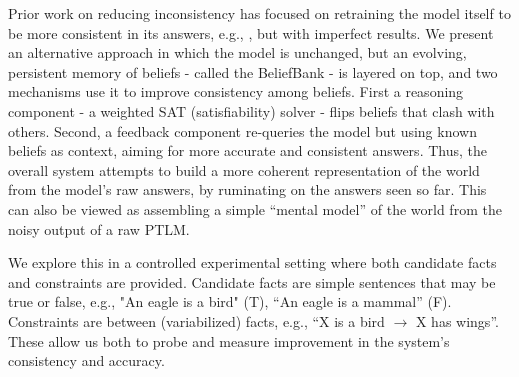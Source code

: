 \documentclass[11pt]{article}
\newcommand{\eat}[1]{}
\newcommand{\red}[1]{\textcolor{red}{#1}}
\begin{document}
Prior work on reducing inconsistency has focused on retraining the model itself to be
more consistent in its answers, e.g., \cite{Ribeiro2019AreRR,Li2019ALF}, but with imperfect results. We present an
alternative approach in which the model is unchanged, but an evolving, persistent memory
of beliefs - called the BeliefBank - is layered on top, and two mechanisms use it 
to improve consistency among beliefs. First a reasoning component - a weighted SAT (satisfiability) solver -
flips beliefs that clash with others. Second, a feedback component re-queries the model
but using known beliefs as context, aiming for more accurate and consistent answers. 
Thus, the overall system attempts to build a more coherent representation of the
world from the model's raw answers, by ruminating on the answers seen so far.
This can also be viewed as assembling a simple ``mental model'' of the world \cite{JohnsonLaird1983MentalM} from
the noisy output of a raw PTLM.

\eat{
In addition, 
just as the model helps populate the BeliefBank, we also show how beliefs in
the BeliefBank can improve the model's answers to future questions,
by using the most relevant beliefs as additional context for question-answering
(i.e., reminding the model of important facts pertinent to the new question).
These improved answers then feed into the growing BeliefBank, allowing the
overall system (model + BeliefBank) to continuously improve performance over
time, without retraining the model itself.
}

We explore this in a controlled experimental setting where 
both candidate facts and constraints are provided. Candidate facts are simple
sentences that may be true or false, e.g., "An eagle is a bird" (T), ``An eagle is a mammal'' (F). Constraints 
are between (variabilized) facts, e.g., ``X is a bird $\rightarrow$ X has wings''. These allow us both to probe and measure improvement
in the system's consistency and accuracy. %

\eat{
\red{Delete/reword this paragraph} Our approach involves an interplay between a model's raw answers, and an
evolving memory - the BeliefBank - of beliefs based on the model's earlier answers
and a set of constraints that should hold. Model's answers contribute to the BeliefBank,
and the BeliefBank contribute new context to help with future question-answering by
the model. In between, a constraint system serves to identify and reduce inconsistency
among beliefs in the BeliefBank. Combined, this results in a system capable of
continuous improvement over time, opening new possibilities for dialog and
interactive teaching.
}
\end{document}

